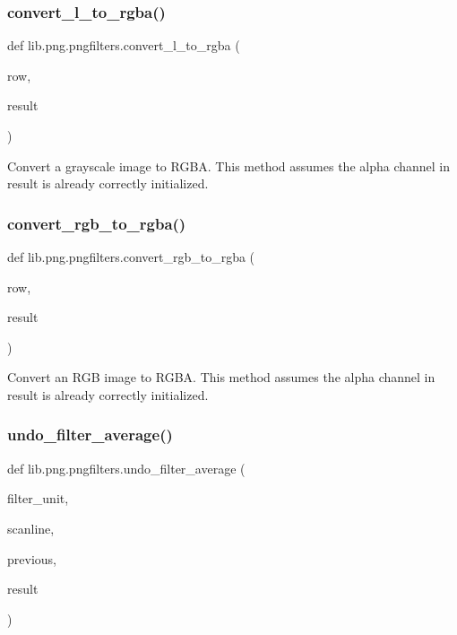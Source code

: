 \subsubsection{\texorpdfstring{convert\+\_\+l\+\_\+to\+\_\+rgba()}{convert\_l\_to\_rgba()}}
{\footnotesize\ttfamily def lib.\+png.\+pngfilters.\+convert\+\_\+l\+\_\+to\+\_\+rgba (\begin{DoxyParamCaption}\item[{}]{row,  }\item[{}]{result }\end{DoxyParamCaption})}

\begin{DoxyVerb}Convert a grayscale image to RGBA. This method assumes
the alpha channel in result is already correctly
initialized.
\end{DoxyVerb}
 \mbox{\label{classlib_1_1png_1_1pngfilters_acf18eebe594a4c9a53bafb28932d280e}} 
\subsubsection{\texorpdfstring{convert\+\_\+rgb\+\_\+to\+\_\+rgba()}{convert\_rgb\_to\_rgba()}}
{\footnotesize\ttfamily def lib.\+png.\+pngfilters.\+convert\+\_\+rgb\+\_\+to\+\_\+rgba (\begin{DoxyParamCaption}\item[{}]{row,  }\item[{}]{result }\end{DoxyParamCaption})}

\begin{DoxyVerb}Convert an RGB image to RGBA. This method assumes the
alpha channel in result is already correctly initialized.
\end{DoxyVerb}
 \mbox{\label{classlib_1_1png_1_1pngfilters_acaf39bb72c89f32a2d1c5c5576f0a4cc}} 
\subsubsection{\texorpdfstring{undo\+\_\+filter\+\_\+average()}{undo\_filter\_average()}}
{\footnotesize\ttfamily def lib.\+png.\+pngfilters.\+undo\+\_\+filter\+\_\+average (\begin{DoxyParamCaption}\item[{}]{filter\+\_\+unit,  }\item[{}]{scanline,  }\item[{}]{previous,  }\item[{}]{result }\end{DoxyParamCaption})}

